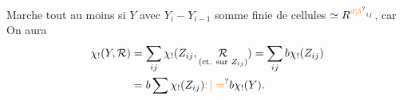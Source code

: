 Marche tout au moins si $Y$   avec $Y_i-Y_{i-1}$ somme finie de cellules  $\simeq R^{\unsure{d|\delta}_{ij}}$, car
On aura
\[
\begin{aligned}
\chi_!(Y,\mathcal R)&=\sum_{ij}\chi_!(Z_{ij},\underset{(\text{ct. sur }Z_{ij})}{\mathcal R})=\sum_{ij}b\chi_!(Z_{ij})\\
&=b\sum\chi_!(Z_{ij})\unsure{\mathpunct{:}|=}b\chi_!(Y).
\end{aligned}
\]


